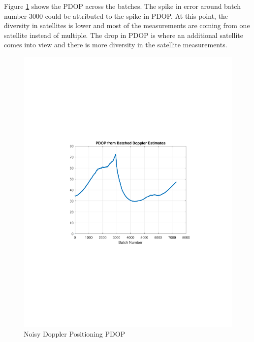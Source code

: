 \documentclass[12pt]{report}
\begin{document}
Figure \ref{fig:DirtyDoppler15minIridPDOP} shows the PDOP across the batches. The spike in error around batch number 3000 could be attributed to the spike in PDOP. At this point, the diversity in satellites is lower and most of the measurements are coming from one satellite instead of multiple. The drop in PDOP is where an additional satellite comes into view and there is more diversity in the satellite measurements. 
\begin{figure}[h!]
    \centering
    \includegraphics[trim=1.2in 3.3in 1.75in 3.3in,clip,width=5in]
    {Irid_15min_noisy_PDOPdoppler.pdf}
    \caption{Noisy Doppler Positioning PDOP}
    \label{fig:DirtyDoppler15minIridPDOP}
\end{figure}
\end{document}
